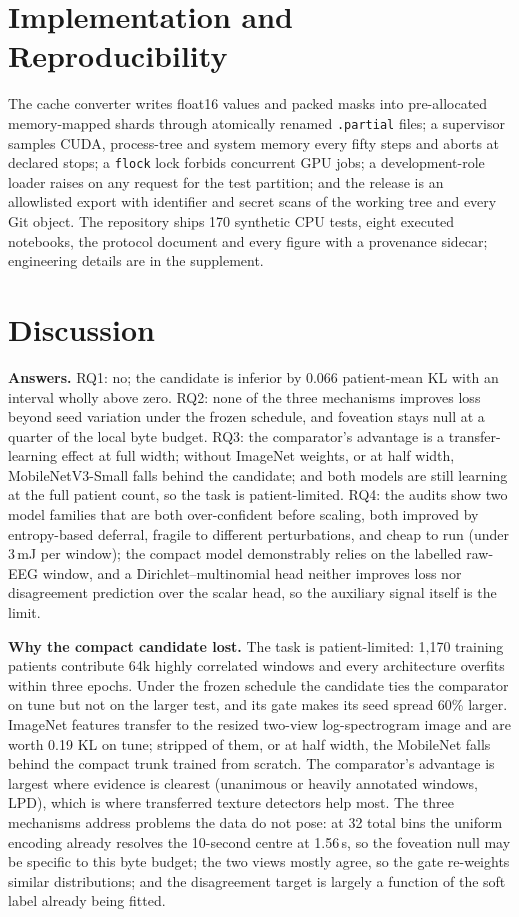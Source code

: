 \documentclass[sigconf,anonymous]{acmart}
\begin{document}
\section{Implementation and Reproducibility}
\label{sec:impl}
The cache converter writes float16 values and packed masks into pre-allocated memory-mapped shards through atomically renamed \texttt{.partial} files; a supervisor samples CUDA, process-tree and system memory every fifty steps and aborts at declared stops; a \texttt{flock} lock forbids concurrent GPU jobs; a development-role loader raises on any request for the test partition; and the release is an allowlisted export with identifier and secret scans of the working tree and every Git object. The repository ships 170 synthetic CPU tests, eight executed notebooks, the protocol document and every figure with a provenance sidecar; engineering details are in the supplement.

\section{Discussion}
\textbf{Answers.} RQ1: no; the candidate is inferior by 0.066 patient-mean KL with an interval wholly above zero. RQ2: none of the three mechanisms improves loss beyond seed variation under the frozen schedule, and foveation stays null at a quarter of the local byte budget. RQ3: the comparator's advantage is a transfer-learning effect at full width; without ImageNet weights, or at half width, MobileNetV3-Small falls behind the candidate; and both models are still learning at the full patient count, so the task is patient-limited. RQ4: the audits show two model families that are both over-confident before scaling, both improved by entropy-based deferral, fragile to different perturbations, and cheap to run (under 3\,mJ per window); the compact model demonstrably relies on the labelled raw-EEG window, and a Dirichlet--multinomial head neither improves loss nor disagreement prediction over the scalar head, so the auxiliary signal itself is the limit.

\textbf{Why the compact candidate lost.} The task is patient-limited: 1,170 training patients contribute 64k highly correlated windows and every architecture overfits within three epochs. Under the frozen schedule the candidate ties the comparator on tune but not on the larger test, and its gate makes its seed spread 60\% larger. ImageNet features transfer to the resized two-view log-spectrogram image and are worth 0.19 KL on tune; stripped of them, or at half width, the MobileNet falls behind the compact trunk trained from scratch. The comparator's advantage is largest where evidence is clearest (unanimous or heavily annotated windows, LPD), which is where transferred texture detectors help most. The three mechanisms address problems the data do not pose: at 32 total bins the uniform encoding already resolves the 10-second centre at 1.56\,s, so the foveation null may be specific to this byte budget; the two views mostly agree, so the gate re-weights similar distributions; and the disagreement target is largely a function of the soft label already being fitted.
\end{document}
